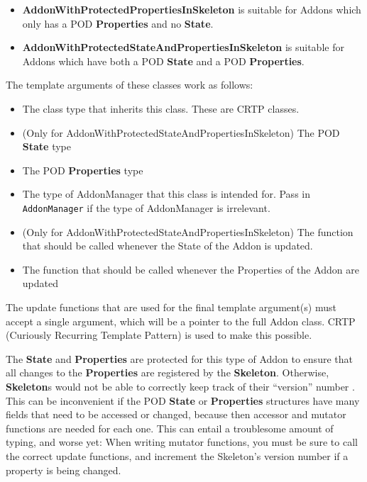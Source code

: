 \begin{itemize}
  \item \textbf{AddonWithProtectedPropertiesInSkeleton} is suitable for Addons which only has a POD \textbf{Properties} and no \textbf{State}.
  \item \textbf{AddonWithProtectedStateAndPropertiesInSkeleton} is suitable for Addons which have both a POD \textbf{State} and a POD \textbf{Properties}.
\end{itemize}

The template arguments of these classes work as follows:

\begin{itemize}
  \item The class type that inherits this class. These are CRTP classes.
  \item (Only for AddonWithProtectedStateAndPropertiesInSkeleton) The POD \textbf{State} type
  \item The POD \textbf{Properties} type
  \item The type of AddonManager that this class is intended for. Pass in \texttt{AddonManager} if the type of AddonManager is irrelevant.
  \item (Only for AddonWithProtectedStateAndPropertiesInSkeleton) The function that should be called whenever the State of the Addon is updated.
  \item The function that should be called whenever the Properties of the Addon are updated
\end{itemize}

The update functions that are used for the final template argument(s) must accept a single argument, which will be a pointer to the full Addon class. CRTP (Curiously Recurring Template Pattern) is used to make this possible.

The \textbf{State} and \textbf{Properties} are protected for this type of Addon to ensure that all changes to the \textbf{Properties} are registered by the \textbf{Skeleton}. Otherwise, \textbf{Skeleton}s would not be able to correctly keep track of their ``version'' number . This can be inconvenient if the POD \textbf{State} or \textbf{Properties} structures have many fields that need to be accessed or changed, because then accessor and mutator functions are needed for each one. This can entail a troublesome amount of typing, and worse yet: When writing mutator functions, you must be sure to call the correct update functions, and increment the Skeleton's version number if a property is being changed.

